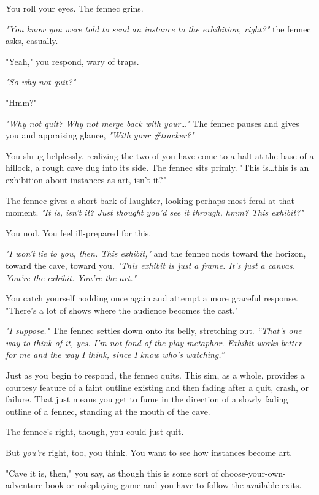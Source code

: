 You roll your eyes. The fennec grins.

\emph{"You know you were told to send an instance to the exhibition, right?"} the fennec asks, casually.

"Yeah," you respond, wary of traps.

\emph{"So why not quit?"}

"Hmm?"

\emph{"Why not quit? Why not merge back with your\ldots{}"} The fennec pauses and gives you and appraising glance, \emph{"With your \#tracker?"}

You shrug helplessly, realizing the two of you have come to a halt at the base of a hillock, a rough cave dug into its side. The fennec sits primly. "This is\ldots{}this is an exhibition about instances as art, isn't it?"

The fennec gives a short bark of laughter, looking perhaps most feral at that moment. \emph{"It is, isn't it? Just thought you'd see it through, hmm? This exhibit?"}

You nod. You feel ill-prepared for this.

\emph{"I won't lie to you, then. This exhibit,"} and the fennec nods toward the horizon, toward the cave, toward you. \emph{"This exhibit is just a frame. It's just a canvas. You're the exhibit. You're the art."}

You catch yourself nodding once again and attempt a more graceful response. "There's a lot of shows where the audience becomes the cast."

\emph{"I suppose."} The fennec settles down onto its belly, stretching out. \emph{``That's one way to think of it, yes. I'm not fond of the play metaphor. Exhibit works better for me and the way I think, since I know who's watching.''}

Just as you begin to respond, the fennec quits. This sim, as a whole, provides a courtesy feature of a faint outline existing and then fading after a quit, crash, or failure. That just means you get to fume in the direction of a slowly fading outline of a fennec, standing at the mouth of the cave.

The fennec's right, though, you could just quit.

But \emph{you're} right, too, you think. You want to see how instances become art.

"Cave it is, then," you say, as though this is some sort of choose-your-own-adventure book or roleplaying game and you have to follow the available exits.

